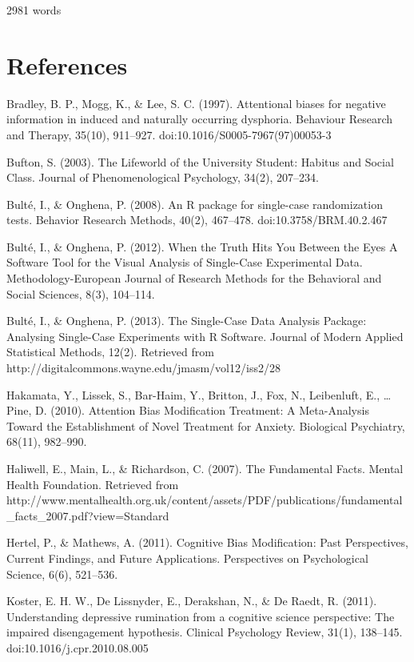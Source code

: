 \documentclass[man,a4paper]{apa6}
\begin{document}
\bigskip

2981 words


\bigskip

\clearpage\section{References}
Bradley, B. P., Mogg, K., \& Lee, S. C. (1997). Attentional biases for negative information in induced and naturally occurring dysphoria. Behaviour Research and Therapy, 35(10), 911--927. doi:10.1016/S0005-7967(97)00053-3

Bufton, S. (2003). The Lifeworld of the University Student: Habitus and Social Class. Journal of Phenomenological Psychology, 34(2), 207--234.

Bult\'e, I., \& Onghena, P. (2008). An R package for single-case randomization tests. Behavior Research Methods, 40(2), 467--478. doi:10.3758/BRM.40.2.467

Bult\'e, I., \& Onghena, P. (2012). When the Truth Hits You Between the Eyes A Software Tool for the Visual Analysis of Single-Case Experimental Data. Methodology-European Journal of Research Methods for the Behavioral and Social Sciences, 8(3), 104--114.

Bult\'e, I., \& Onghena, P. (2013). The Single-Case Data Analysis Package: Analysing Single-Case Experiments with R Software. Journal of Modern Applied Statistical Methods, 12(2). Retrieved from http://digitalcommons.wayne.edu/jmasm/vol12/iss2/28

Hakamata, Y., Lissek, S., Bar-Haim, Y., Britton, J., Fox, N., Leibenluft, E., {\dots} Pine, D. (2010). Attention Bias Modification Treatment: A Meta-Analysis Toward the Establishment of Novel Treatment for Anxiety. Biological Psychiatry, 68(11), 982--990.

Haliwell, E., Main, L., \& Richardson, C. (2007). The Fundamental Facts. Mental Health Foundation. Retrieved from http://www.mentalhealth.org.uk/content/assets/PDF/publications/fundamental\_facts\_2007.pdf?view=Standard

Hertel, P., \& Mathews, A. (2011). Cognitive Bias Modification: Past Perspectives, Current Findings, and Future Applications. Perspectives on Psychological Science, 6(6), 521--536.

Koster, E. H. W., De Lissnyder, E., Derakshan, N., \& De Raedt, R. (2011). Understanding depressive rumination from a cognitive science perspective: The impaired disengagement hypothesis. Clinical Psychology Review, 31(1), 138--145. doi:10.1016/j.cpr.2010.08.005
\end{document}

